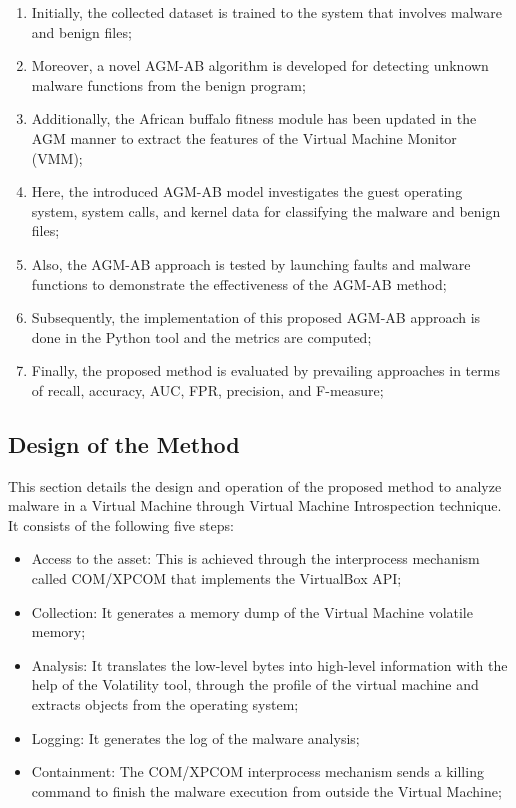 \documentclass{gji}
\begin{document}
\begin{enumerate}
\item Initially, the collected dataset is trained to the system that involves malware and benign files;
\item Moreover, a novel AGM-AB algorithm is developed for detecting unknown malware functions from the benign program;
\item Additionally, the African buffalo fitness module has been updated in the AGM manner to extract the features of the Virtual Machine Monitor (VMM);
\item Here, the introduced AGM-AB model investigates the guest operating system, system calls, and kernel data for classifying the malware and benign files;
\item Also, the AGM-AB approach is tested by launching faults and malware functions to demonstrate the effectiveness of the AGM-AB method;
\item Subsequently, the implementation of this proposed AGM-AB approach is done in the Python tool and the metrics are computed;
\item Finally, the proposed method is evaluated by prevailing approaches in terms of recall, accuracy, AUC, FPR, precision, and F-measure;
\end{enumerate}

\subsection{Design of the Method}
This section details the design and operation of the proposed method to analyze malware in a Virtual Machine through Virtual Machine Introspection technique. It consists of the following five steps: 
\begin{itemize}
  \item Access to the asset: This is achieved through the interprocess mechanism called COM/XPCOM that implements the VirtualBox API;
  \item Collection: It generates a memory dump of the Virtual Machine volatile memory;
  \item Analysis: It translates the low-level bytes into high-level information with the help of the Volatility tool, through the profile of the virtual machine and extracts objects from the operating system;
  \item Logging: It generates the log of the malware analysis;
  \item Containment: The COM/XPCOM interprocess mechanism sends a killing command to finish the malware execution from outside the Virtual Machine;
\end{itemize} 
\end{document}
